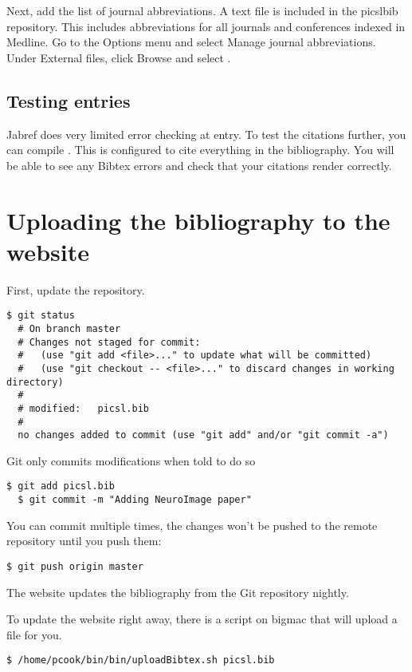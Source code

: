 \documentclass{InsightArticle}
\begin{document}
Next, add the list of journal abbreviations. A text file  is included in the picslbib repository. This includes abbreviations for all journals and conferences indexed in Medline. Go to the Options menu and select Manage journal abbreviations. Under External files, click Browse and select .

\subsection{Testing entries}

Jabref does very limited error checking at entry. To test the citations further, you can compile . This is configured to cite everything in the bibliography. You will be able to see any Bibtex errors and check that your citations render correctly.


\section{Uploading the bibliography to the website}

First, update the repository.

\begin{lstlisting}[style=bash]
  $ git status
  # On branch master
  # Changes not staged for commit:
  #   (use "git add <file>..." to update what will be committed)
  #   (use "git checkout -- <file>..." to discard changes in working directory)
  #
  #	modified:   picsl.bib
  #
  no changes added to commit (use "git add" and/or "git commit -a")
\end{lstlisting}

Git only commits modifications when told to do so
\begin{lstlisting}[style=bash]
  $ git add picsl.bib
  $ git commit -m "Adding NeuroImage paper" 
\end{lstlisting}

You can commit multiple times, the changes won't be pushed to the remote repository until you push them:
\begin{lstlisting}[style=bash]
  $ git push origin master 
\end{lstlisting}

The website updates the bibliography from the Git repository nightly.

To update the website right away, there is a script on bigmac that will upload a file for you.
\begin{lstlisting}[style=bash]
  $ /home/pcook/bin/bin/uploadBibtex.sh picsl.bib
\end{lstlisting}
\end{document}
